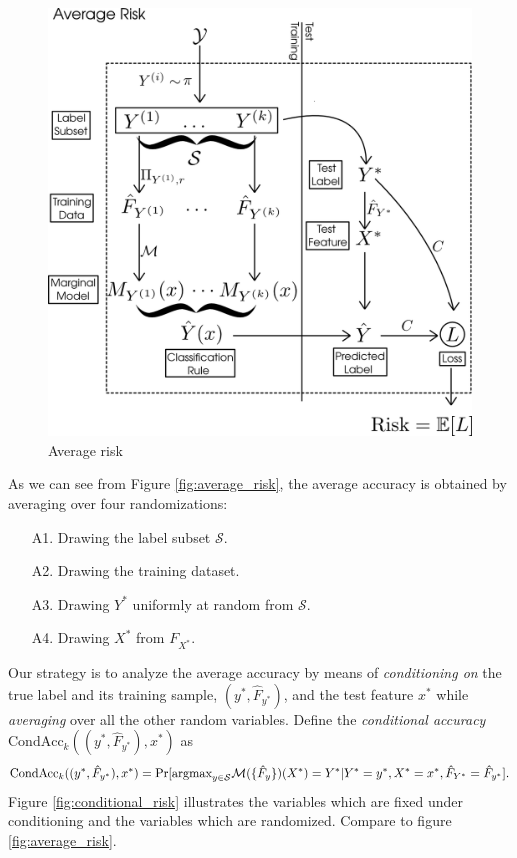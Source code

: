 \begin{figure}[h]
\centering
\includegraphics[scale = 0.3]{../extrapolation_figures/average_risk.png}
\caption{Average risk}\label{fig:average_risk2}
\end{figure}

\fi

As we can see from Figure \ref{fig:average_risk}, the average accuracy is
obtained by averaging over four randomizations:
\begin{enumerate}
\item[A1.] Drawing the label subset $\mathcal{S}$.
\item[A2.] Drawing the training dataset.
\item[A3.] Drawing $Y^*$ uniformly at random from $\mathcal{S}$.
\item[A4.] Drawing $X^*$ from $F_{X^*}$.
\end{enumerate}


Our strategy is to analyze the average accuracy by
means of \emph{conditioning on} the true label and its training
sample, $(y^*, \hat{F}_{y^*})$, and the test feature $x^*$
while \emph{averaging} over all the other random variables.  Define
the \emph{conditional accuracy} $\text{CondAcc}_k((y^*, \hat{F}_{y^*}), x^*)$ as
\[
\text{CondAcc}_k((y^*, \hat{F}_{y^*}), x^*) = \Pr[\text{argmax}_{y \in \mathcal{S}} \mathcal{M}(\{\hat{F}_y\})(X^*) = Y^* |Y^*=y^*, X^* = x^*, \hat{F}_{Y^*} = \hat{F}_{y^*}].
\]
Figure \ref{fig:conditional_risk} illustrates the variables which are
fixed under conditioning and the variables which are randomized.
Compare to figure \ref{fig:average_risk}.

